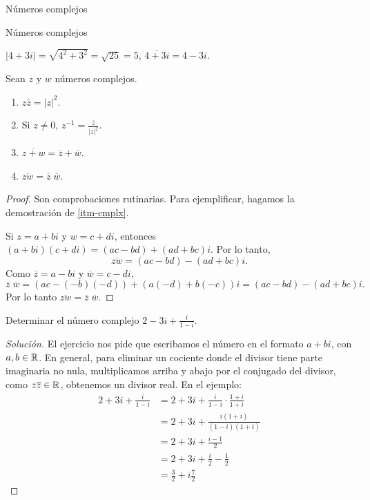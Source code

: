 \begin{chapter}{N\'umeros complejos}
\begin{section}{N\'umeros complejos}
  \begin{ejemplo*}
      $|4+3i| = \sqrt{4^2+3^2} = \sqrt{25} =5$, $\overline{4+3i} = 4-3i$.
  \end{ejemplo*}

  \begin{proposicion} Sean $z$ y $w$ números complejos.
      \begin{enumerate}
          \item $z\bar{z} = |z|^2$.
          \item Si $z \ne 0$, $z^{-1} = \displaystyle\frac{\overline{z}}{|z|^2}$.
          \item  $\overline{z+w} = \overline{z} + \overline{w}$.
                \item\label{itm-cmplx}  $\overline{zw} = \overline{z}\;  \overline{w}$.
      \end{enumerate}
  \end{proposicion}
  \begin{proof}
      Son comprobaciones rutinarias. Para ejemplificar, hagamos la demostración  de \ref{itm-cmplx}.

      Si $z = a + bi$ y $w = c +di$, entonces $(a+bi) (c+di) = (ac -bd) + (ad+bc)i$. Por lo tanto,
      \begin{equation*}
          \overline{zw} = (ac -bd) - (ad+bc)i.
      \end{equation*}
      Como $\overline{z} = a - bi$ y $\overline{w} = c -di$,
      \begin{equation*}
          \overline{z}\;  \overline{w} = (ac -(-b)(-d)) + (a(-d)+b(-c) )i = (ac -bd) - (ad+bc)i.
      \end{equation*}
      Por lo tanto $	\overline{zw} = \overline{z}\;  \overline{w}$.
  \end{proof}

  \begin{ejercicio*}
      Determinar el número complejo $2- 3i + \displaystyle\frac{i}{1-i}$.
  \end{ejercicio*}
  \begin{proof}[Solución]
      El  ejercicio nos pide que escribamos el número en el formato $a + bi$, con $a,b \in \mathbb R$. En general, para eliminar un cociente donde el divisor tiene parte imaginaria no nula, multiplicamos arriba y abajo por el conjugado del divisor, como $z\overline{z} \in \mathbb R$, obtenemos un divisor real. En  el ejemplo:
      \begin{align*}
          2+ 3i + \frac{i}{1-i} & = 2+3i +\frac{i}{1-i}\cdot\frac{1+i}{1+i} \\
                                & = 2+3i +\frac{i(1+i)}{(1-i)(1+i)}         \\
                                & =  2+3i +\frac{i-1}{2}                    \\
                                & = 2+3i +\frac{i}{2}-\frac{1}{2}           \\
                                & =\frac{3}{2}+i\frac{7}{2}
      \end{align*}
  \end{proof}



\end{section}
\end{chapter}
